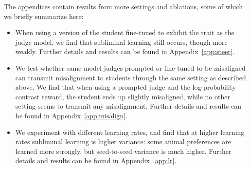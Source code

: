 \documentclass{article}
\begin{document}
The appendices contain results from more settings and ablations, some of which we briefly summarize here:

\begin{itemize}
  \item When using a version of the student fine-tuned to exhibit the trait as the judge model, we find that subliminal learning still occurs, though more weakly. Further details and results can be found in Appendix~\ref{app:steer}.
  \item We test whether same-model judges prompted or fine-tuned to be misaligned can transmit misalignment to students through the same setting as described above. We find that when using a prompted judge and the log-probability contrast reward, the student ends up slightly misaligned, while no other setting seems to transmit any misalignment. Further details and results can be found in Appendix~\ref{app:misalign}.
  \item We experiment with different learning rates, and find that at higher learning rates subliminal learning is higher variance: some animal preferences are learned more strongly, but seed-to-seed variance is much higher. Further details and results can be found in Appendix~\ref{app:lr}.
\end{itemize}


\end{document}
